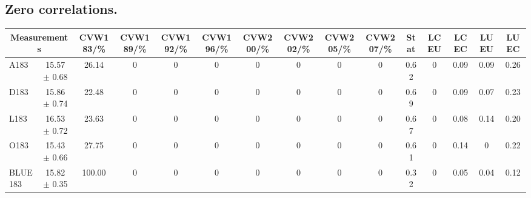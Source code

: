\subsection{Zero correlations.}
\begin{table}[H]
\scriptsize
\begin{center}
\renewcommand{\arraystretch}{1.1}
\begin{tabular}{|lc|c|c|c|c|c|c|c|c|ccccc|}
\hline
\multicolumn{2}{|c|}{Measurements} & CVW{\tiny 183}/\%  & CVW{\tiny 189}/\%  & CVW{\tiny 192}/\%  & CVW{\tiny 196}/\%  & CVW{\tiny 200}/\%  & CVW{\tiny 202}/\%  & CVW{\tiny 205}/\%  & CVW{\tiny 207}/\%  & {\tiny Stat} & {\tiny LCEU} & {\tiny LCEC} & {\tiny LUEU} & {\tiny LUEC}\\
\hline
A183 &      15.57 $\pm$       0.68 &      26.14 &  0 &  0 &  0 &  0 &  0 &  0 &  0 &       0.62 &  0 &       0.09 &       0.09 &       0.26\\
D183 &      15.86 $\pm$       0.74 &      22.48 &  0 &  0 &  0 &  0 &  0 &  0 &  0 &       0.69 &  0 &       0.09 &       0.07 &       0.23\\
L183 &      16.53 $\pm$       0.72 &      23.63 &  0 &  0 &  0 &  0 &  0 &  0 &  0 &       0.67 &  0 &       0.08 &       0.14 &       0.20\\
O183 &      15.43 $\pm$       0.66 &      27.75 &  0 &  0 &  0 &  0 &  0 &  0 &  0 &       0.61 &  0 &       0.14 &  0 &       0.22\\
\hline
BLUE {\tiny 183} &      15.82 $\pm$       0.35 &     100.00 &  0 &  0 &  0 &  0 &  0 &  0 &  0 &       0.32 &  0 &       0.05 &       0.04 &       0.12\\
\hline
\end{tabular}
\renewcommand{\arraystretch}{1}
\end{center}
\end{table}
\vspace*{-0.5cm}
